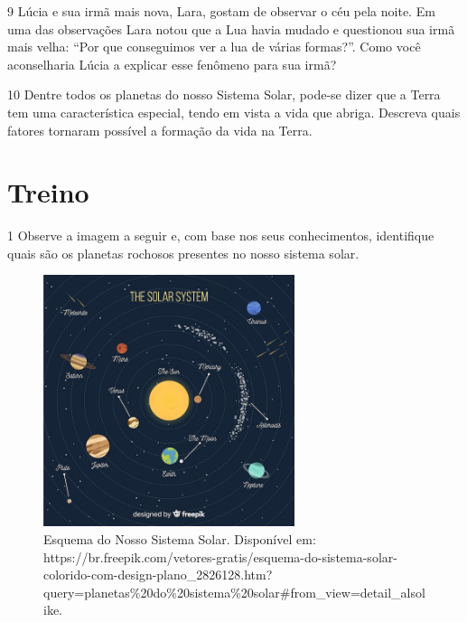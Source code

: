 \num{9}  Lúcia e sua irmã mais nova, Lara, gostam de observar o céu pela noite.
  Em uma das observações Lara notou que a Lua havia mudado e questionou
  sua irmã mais velha: ``Por que conseguimos ver a lua de várias
  formas?''. Como você aconselharia Lúcia a explicar esse fenômeno para sua irmã?



\num{10}  Dentre todos os planetas do nosso Sistema Solar, pode-se dizer que a
  Terra tem uma característica especial, tendo em vista a vida que
  abriga. Descreva quais fatores tornaram possível a formação da vida na Terra.



\section{Treino}

\num{1} Observe a imagem a seguir e, com base nos seus conhecimentos, identifique quais são os planetas rochosos presentes no nosso sistema solar.

\begin{figure}[htpb!]
\includegraphics[width=2.89583in,height=2.89583in]{./imgs/img12.jpg}
\caption{Esquema do Nosso Sistema Solar. Disponível em:
https://br.freepik.com/vetores-gratis/esquema-do-sistema-solar-colorido-com-design-plano\_2826128.htm?query=planetas\%20do\%20sistema\%20solar\#from\_view=detail\_alsolike.}
\end{figure}

